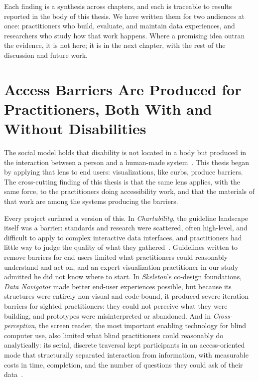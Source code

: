 \documentclass[12pt]{cmuthesis}
\begin{document}
Each finding is a synthesis across chapters, and each is traceable to results reported in the body of this thesis. We have written them for two audiences at once: practitioners who build, evaluate, and maintain data experiences, and researchers who study how that work happens. Where a promising idea outran the evidence, it is not here; it is in the next chapter, with the rest of the discussion and future work.

\section{Access Barriers Are Produced for Practitioners, Both With and Without Disabilities}

The social model holds that disability is not located in a body but produced in the interaction between a person and a human-made system~\cite{Marks1997}. This thesis began by applying that lens to end users: visualizations, like curbs, produce barriers. The cross-cutting finding of this thesis is that the same lens applies, with the same force, to the practitioners doing accessibility work, and that the materials of that work are among the systems producing the barriers.

Every project surfaced a version of this. In \textit{Chartability}, the guideline landscape itself was a barrier: standards and research were scattered, often high-level, and difficult to apply to complex interactive data interfaces, and practitioners had little way to judge the quality of what they gathered~\cite{Joyner2022Wild, Sharif2024Challenges}. Guidelines written to remove barriers for end users limited what practitioners could reasonably understand and act on, and an expert visualization practitioner in our study admitted he did not know where to start. In \textit{Skeleton}'s co-design foundations, \textit{Data Navigator} made better end-user experiences possible, but because its structures were entirely non-visual and code-bound, it produced severe iteration barriers for sighted practitioners: they could not perceive what they were building, and prototypes were misinterpreted or abandoned. And in \textit{Cross-perception}, the screen reader, the most important enabling technology for blind computer use, also limited what blind practitioners could reasonably do analytically: its serial, discrete traversal kept participants in an access-oriented mode that structurally separated interaction from information, with measurable costs in time, completion, and the number of questions they could ask of their data~\cite{Sharif2021}.
\end{document}
